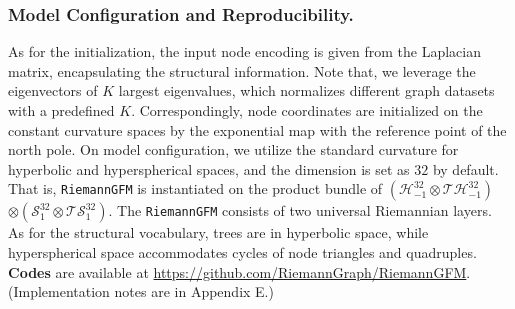 \subsubsection{\textbf{Model Configuration and Reproducibility.}}
As for the initialization,
the input node encoding is given from the Laplacian matrix, encapsulating the structural information.
Note that, we leverage the eigenvectors of $K$ largest eigenvalues, which normalizes different graph datasets with a predefined $K$.
Correspondingly, node coordinates are initialized on the constant curvature spaces by the exponential map with the reference point of the north pole.
On model configuration,
we utilize the standard curvature for hyperbolic and hyperspherical spaces, and the dimension is set as $32$ by default. That is, \texttt{RiemannGFM} is instantiated on the product bundle of 
$\left(\mathcal H^{32}_{-1} \otimes \mathcal T\mathcal H^{32}_{-1}\right)$
$ \otimes \left(\mathcal S^{32}_{1} \otimes \mathcal T\mathcal S^{32}_{1}\right)$.
The \texttt{RiemannGFM} consists of two universal Riemannian layers.
As for the structural vocabulary, trees are in hyperbolic space, while hyperspherical space accommodates cycles of node triangles and quadruples.
\textbf{Codes} are available at {\color{blue}\url{https://github.com/RiemannGraph/RiemannGFM}}.
(Implementation notes are in Appendix E.)

